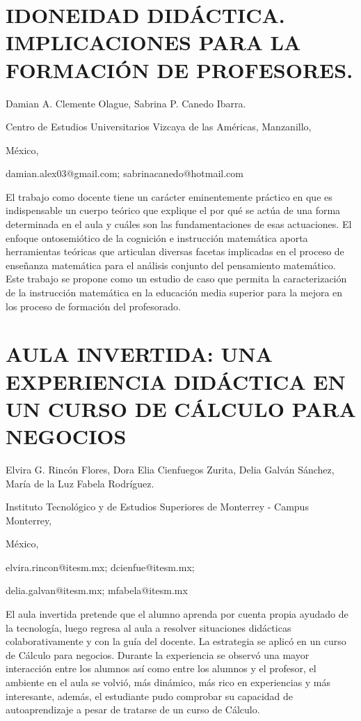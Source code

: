 \section{IDONEIDAD DIDÁCTICA. IMPLICACIONES PARA LA FORMACIÓN DE PROFESORES.}

\begin{datos}

Damian A. Clemente Olague, Sabrina P. Canedo Ibarra.

Centro de Estudios Universitarios Vizcaya de las Américas, Manzanillo,

México,

damian.alex03@gmail.com; sabrinacanedo@hotmail.com

\end{datos}

El trabajo como docente tiene un carácter eminentemente práctico en
que es indispensable un cuerpo teórico que explique el por qué se
actúa de una forma determinada en el aula y cuáles son las fundamentaciones
de esas actuaciones. El enfoque ontosemiótico de la cognición e instrucción
matemática aporta herramientas teóricas que articulan diversas facetas
implicadas en el proceso de enseñanza matemática para el análisis
conjunto del pensamiento matemático. Este trabajo se propone como
un estudio de caso que permita la caracterización de la instrucción
matemática en la educación media superior para la mejora en los proceso
de formación del profesorado.


\section{AULA INVERTIDA: UNA EXPERIENCIA DIDÁCTICA EN UN CURSO DE CÁLCULO
PARA NEGOCIOS}

\begin{datos}

Elvira G. Rincón Flores, Dora Elia Cienfuegos Zurita, Delia Galván
Sánchez, María de la Luz Fabela Rodríguez.

Instituto Tecnológico y de Estudios Superiores de Monterrey - Campus
Monterrey,

México,

elvira.rincon@itesm.mx; dcienfue@itesm.mx;

delia.galvan@itesm.mx; mfabela@itesm.mx

\end{datos}

El aula invertida pretende que el alumno aprenda por cuenta propia
ayudado de la tecnología, luego regresa al aula a resolver situaciones
didácticas colaborativamente y con la guía del docente. La estrategia
se aplicó en un curso de Cálculo para negocios. Durante la experiencia
se observó una mayor interacción entre los alumnos así como entre
los alumnos y el profesor, el ambiente en el aula se volvió, más dinámico,
más rico en experiencias y más interesante, además, el estudiante
pudo comprobar su capacidad de autoaprendizaje a pesar de tratarse
de un curso de Cálculo.


